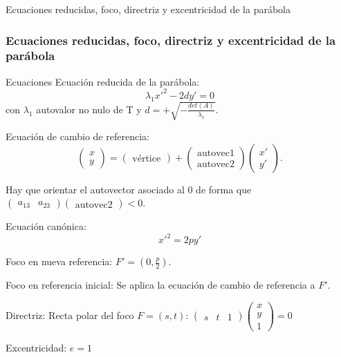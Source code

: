 \documentclass[xcolor={dvipsnames},aspectratio=169,10pt]{beamer}
\begin{document}
\begin{frame}{Ecuaciones reducidas, foco, directriz y excentricidad de la parábola}
  \frametitle{Ecuaciones reducidas, foco, directriz y excentricidad de la parábola}
  \begin{block}{Ecuaciones}
    Ecuación reducida de la parábola:
    \[\lambda_1x'^2 - 2dy' = 0\]
    con $\lambda_1$ autovalor no nulo de T y $d = +\sqrt{-\frac{det(A)}{\lambda_1}}$.
    
    Ecuación de cambio de referencia:
    \[\begin{pmatrix} x \\ y \end{pmatrix} = \begin{pmatrix} \text{vértice} \end{pmatrix} + \begin{pmatrix} \text{autovec1} \\ \text{autovec2} \end{pmatrix} \begin{pmatrix} x' \\ y' \end{pmatrix}.\]
    
    Hay que orientar el autovector asociado al 0 de forma que $\begin{pmatrix} a_{13} & a_{23} \end{pmatrix} \begin{pmatrix} \text{autovec2} \end{pmatrix} < 0$.
    
    Ecuación canónica:
    \[x'^2 = 2py'\]
    
    Foco en nueva referencia: $F' = (0, \frac{p}{2})$.
    
    Foco en referencia inicial: Se aplica la ecuación de cambio de referencia a $F'$.
    
    Directriz: Recta polar del foco $F = (s, t)$: $\begin{pmatrix} s & t & 1 \end{pmatrix} \begin{pmatrix} x \\ y \\ 1 \end{pmatrix} = 0$
    
    Excentricidad: $e = 1$
  \end{block}
\end{frame}
\end{document}
